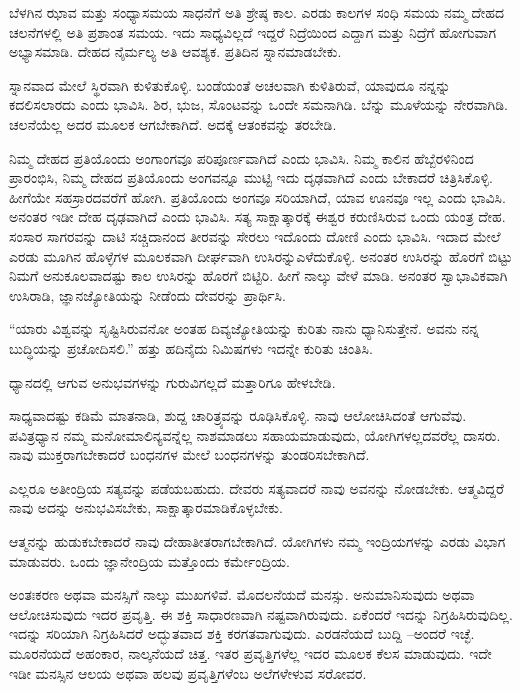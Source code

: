 ಬೆಳಗಿನ ಝಾವ ಮತ್ತು ಸಂಧ್ಯಾಸಮಯ ಸಾಧನೆಗೆ ಅತಿ ಶ್ರೇಷ್ಠ ಕಾಲ. ಎರಡು ಕಾಲಗಳ ಸಂಧಿ ಸಮಯ ನಮ್ಮ ದೇಹದ ಚಲನೆಗಳಲ್ಲಿ ಅತಿ ಪ್ರಶಾಂತ ಸಮಯ. ಇದು ಸಾಧ್ಯವಿಲ್ಲದೆ ಇದ್ದರೆ ನಿದ್ರೆಯಿಂದ ಎದ್ದಾಗ ಮತ್ತು ನಿದ್ರೆಗೆ ಹೋಗುವಾಗ ಅಭ್ಯಾಸಮಾಡಿ. ದೇಹದ ನೈರ್ಮಲ್ಯ ಅತಿ ಆವಶ್ಯಕ. ಪ್ರತಿದಿನ ಸ್ನಾನಮಾಡಬೇಕು.

ಸ್ನಾನವಾದ ಮೇಲೆ ಸ್ಥಿರವಾಗಿ ಕುಳಿತುಕೊಳ್ಳಿ. ಬಂಡೆಯಂತೆ ಅಚಲವಾಗಿ ಕುಳಿತಿರುವೆ, ಯಾವುದೂ ನನ್ನನ್ನು ಕದಲಿಸಲಾರದು ಎಂದು ಭಾವಿಸಿ. ಶಿರ, ಭುಜ, ಸೊಂಟವನ್ನು ಒಂದೇ ಸಮನಾಗಿಡಿ. ಬೆನ್ನು ಮೂಳೆಯನ್ನು ನೇರವಾಗಿಡಿ. ಚಲನೆಯೆಲ್ಲ ಅದರ ಮೂಲಕ ಆಗಬೇಕಾಗಿದೆ. ಅದಕ್ಕೆ ಆತಂಕವನ್ನು ತರಬೇಡಿ.

ನಿಮ್ಮ ದೇಹದ ಪ್ರತಿಯೊಂದು ಅಂಗಾಂಗವೂ ಪರಿಪೂರ್ಣವಾಗಿದೆ ಎಂದು ಭಾವಿಸಿ. ನಿಮ್ಮ ಕಾಲಿನ ಹೆಬ್ಬೆರಳಿನಿಂದ ಪ್ರಾರಂಭಿಸಿ, ನಿಮ್ಮ ದೇಹದ ಪ್ರತಿಯೊಂದು ಅಂಗವನ್ನೂ ಮುಟ್ಟಿ ಇದು ದೃಢವಾಗಿದೆ ಎಂದು ಬೇಕಾದರೆ ಚಿತ್ರಿಸಿಕೊಳ್ಳಿ. ಹೀಗೆಯೇ ಸಹಸ್ರಾರದವರೆಗೆ ಹೋಗಿ. ಪ್ರತಿಯೊಂದು ಅಂಗವೂ ಸರಿಯಾಗಿದೆ, ಯಾವ ಊನವೂ ಇಲ್ಲ ಎಂದು ಭಾವಿಸಿ. ಅನಂತರ ಇಡೀ ದೇಹ ದೃಢವಾಗಿದೆ ಎಂದು ಭಾವಿಸಿ. ಸತ್ಯ ಸಾಕ್ಷಾತ್ಕಾರಕ್ಕೆ ಈಶ್ವರ ಕರುಣಿಸಿರುವ ಒಂದು ಯಂತ್ರ ದೇಹ. ಸಂಸಾರ ಸಾಗರವನ್ನು ದಾಟಿ ಸಚ್ಚಿದಾನಂದ ತೀರವನ್ನು ಸೇರಲು ಇದೊಂದು ದೋಣಿ ಎಂದು ಭಾವಿಸಿ. ಇದಾದ ಮೇಲೆ ಎರಡು ಮೂಗಿನ ಹೊಳ್ಳೆಗಳ ಮೂಲಕವಾಗಿ ದೀರ್ಘವಾಗಿ ಉಸಿರನ್ನು\break ಎಳೆದುಕೊಳ್ಳಿ. ಅನಂತರ ಉಸಿರನ್ನು ಹೊರಗೆ ಬಿಟ್ಟು ನಿಮಗೆ ಅನುಕೂಲವಾದಷ್ಟು ಕಾಲ ಉಸಿರನ್ನು ಹೊರಗೆ ಬಿಟ್ಟಿರಿ. ಹೀಗೆ ನಾಲ್ಕು ವೇಳೆ ಮಾಡಿ. ಅನಂತರ ಸ್ವಾಭಾವಿಕವಾಗಿ ಉಸಿರಾಡಿ, ಜ್ಞಾನಜ್ಯೋತಿಯನ್ನು ನೀಡೆಂದು ದೇವರನ್ನು ಪ್ರಾರ್ಥಿಸಿ.

“ಯಾರು ವಿಶ್ವವನ್ನು ಸೃಷ್ಟಿಸಿರುವನೋ ಅಂತಹ ದಿವ್ಯಜ್ಯೋತಿಯನ್ನು ಕುರಿತು ನಾನು ಧ್ಯಾನಿಸುತ್ತೇನೆ. ಅವನು ನನ್ನ ಬುದ್ಧಿಯನ್ನು ಪ್ರಚೋದಿಸಲಿ.'' ಹತ್ತು ಹದಿನೈದು ನಿಮಿಷಗಳು ಇದನ್ನೇ ಕುರಿತು ಚಿಂತಿಸಿ.

ಧ್ಯಾನದಲ್ಲಿ ಆಗುವ ಅನುಭವಗಳನ್ನು ಗುರುವಿಗಲ್ಲದೆ ಮತ್ತಾರಿಗೂ ಹೇಳಬೇಡಿ.

ಸಾಧ್ಯವಾದಷ್ಟು ಕಡಿಮೆ ಮಾತನಾಡಿ, ಶುದ್ದ ಚಾರಿತ್ರ್ಯವನ್ನು ರೂಢಿಸಿಕೊಳ್ಳಿ. ನಾವು ಆಲೋಚಿಸಿದಂತೆ ಆಗುವೆವು. ಪವಿತ್ರಧ್ಯಾನ ನಮ್ಮ ಮನೋಮಾಲಿನ್ಯವನ್ನೆಲ್ಲ ನಾಶಮಾಡಲು ಸಹಾಯಮಾಡುವುದು, ಯೋಗಿಗಳಲ್ಲದವರೆಲ್ಲ ದಾಸರು. ನಾವು ಮುಕ್ತರಾಗಬೇಕಾದರೆ ಬಂಧನಗಳ ಮೇಲೆ ಬಂಧನಗಳನ್ನು ತುಂಡರಿಸಬೇಕಾಗಿದೆ.

ಎಲ್ಲರೂ ಅತೀಂದ್ರಿಯ ಸತ್ಯವನ್ನು ಪಡೆಯಬಹುದು. ದೇವರು ಸತ್ಯವಾದರೆ ನಾವು ಅವನನ್ನು ನೋಡಬೇಕು. ಆತ್ಮವಿದ್ದರೆ ನಾವು ಅದನ್ನು ಅನುಭವಿಸಬೇಕು, ಸಾಕ್ಷಾತ್ಕಾರಮಾಡಿಕೊಳ್ಳಬೇಕು.

ಆತ್ಮನನ್ನು ಹುಡುಕಬೇಕಾದರೆ ನಾವು ದೇಹಾತೀತರಾಗಬೇಕಾಗಿದೆ. ಯೋಗಿಗಳು ನಮ್ಮ ಇಂದ್ರಿಯಗಳನ್ನು ಎರಡು ವಿಭಾಗ ಮಾಡುವರು. ಒಂದು ಜ್ಞಾನೇಂದ್ರಿಯ ಮತ್ತೊಂದು ಕರ್ಮೇಂದ್ರಿಯ.

ಅಂತಃಕರಣ ಅಥವಾ ಮನಸ್ಸಿಗೆ ನಾಲ್ಕು ಮುಖಗಳಿವೆ. ಮೊದಲನೆಯದೆ ಮನಸ್ಸು. ಅನುಮಾನಿಸುವುದು ಅಥವಾ ಆಲೋಚಿಸುವುದು ಇದರ ಪ್ರವೃತ್ತಿ. ಈ ಶಕ್ತಿ ಸಾಧಾರಣವಾಗಿ ನಷ್ಟವಾಗಿರುವುದು. ಏಕೆಂದರೆ ಇದನ್ನು ನಿಗ್ರಹಿಸಿರುವುದಿಲ್ಲ. ಇದನ್ನು ಸರಿಯಾಗಿ ನಿಗ್ರಹಿಸಿದರೆ ಅದ್ಭುತವಾದ ಶಕ್ತಿ ಕರಗತವಾಗುವುದು. ಎರಡನೆಯದೆ ಬುದ್ದಿ –ಅಂದರೆ ಇಚ್ಛೆ. ಮೂರನೆಯದೆ ಅಹಂಕಾರ, ನಾಲ್ಕನೆಯದೆ ಚಿತ್ತ. ಇತರ ಪ್ರವೃತ್ತಿಗಳೆಲ್ಲ ಇದರ ಮೂಲಕ ಕೆಲಸ ಮಾಡುವುದು. ಇದೇ ಇಡೀ ಮನಸ್ಸಿನ ಆಲಯ ಅಥವಾ ಹಲವು ಪ್ರವೃತ್ತಿಗಳೆಂಬ ಅಲೆಗಳೇಳುವ ಸರೋವರ.

